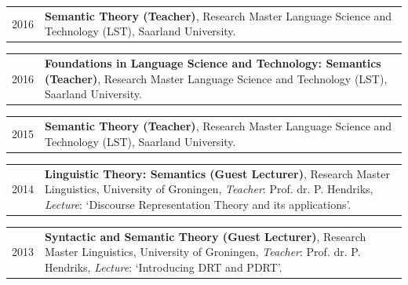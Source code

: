 \documentclass[a4paper,10pt]{article}
\def\leftcolwidth{.12\textwidth}
\def\tablevspace{10pt}
\begin{document}
\noindent
\begin{tabularx}{\textwidth}{ p{\leftcolwidth} X }
  2016
  & \textbf{Semantic Theory (Teacher)}, Research Master Language
    Science and Technology (LST), Saarland University.\\
\end{tabularx}

\vspace{\tablevspace}

\noindent
\begin{tabularx}{\textwidth}{ p{\leftcolwidth} X }
  2016
  & \textbf{Foundations in Language Science and Technology: Semantics
    (Teacher)}, Research Master Language Science and Technology (LST),
    Saarland University.\\
\end{tabularx}

\vspace{\tablevspace}

\noindent
\begin{tabularx}{\textwidth}{ p{\leftcolwidth} X }
  2015
  & \textbf{Semantic Theory (Teacher)}, Research Master Language
    Science and Technology (LST), Saarland University.\\
\end{tabularx}

\vspace{\tablevspace}

\noindent
\begin{tabularx}{\textwidth}{ p{\leftcolwidth} X }
  2014
  & \textbf{Linguistic Theory: Semantics (Guest Lecturer)}, 
    Research Master Linguistics, University of Groningen,
    \textit{Teacher}: Prof. dr. P. Hendriks,
    \textit{Lecture}: `Discourse Representation Theory and its applications'.
\end{tabularx}

\vspace{\tablevspace}

\noindent
\begin{tabularx}{\textwidth}{ p{\leftcolwidth} X }
  2013
  & \textbf{Syntactic and Semantic Theory (Guest Lecturer)},
    Research Master Linguistics, University of Groningen,
    \textit{Teacher}: Prof. dr. P. Hendriks,
    \textit{Lecture}: `Introducing DRT and PDRT'.
\end{tabularx}

\vspace{\tablevspace}
\end{document}
